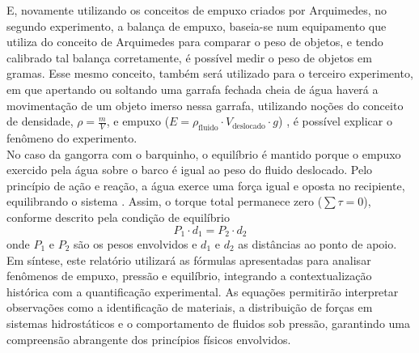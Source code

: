 E, novamente utilizando os conceitos de empuxo criados por Arquimedes, no segundo experimento, a balança de empuxo, baseia-se num equipamento que utiliza do conceito de Arquimedes para comparar o peso de objetos, e tendo calibrado tal balança corretamente, é possível medir o peso de objetos em gramas. Esse mesmo conceito, também será utilizado para o terceiro experimento, em que apertando ou soltando uma garrafa fechada cheia de água haverá a movimentação de um objeto imerso nessa garrafa, utilizando noções do conceito de densidade, $\rho = \frac{m}{V}$, e empuxo ($E = \rho_{\text{fluido}} \cdot V_{\text{deslocado}} \cdot g$) \cite{nussenzveig2014}, é possível explicar o fenômeno do experimento.\\

No caso da gangorra com o barquinho, o equilíbrio é mantido porque o empuxo exercido pela água sobre o barco é igual ao peso do fluido deslocado. Pelo princípio de ação e reação, a água exerce uma força igual e oposta no recipiente, equilibrando o sistema \cite{nussenzveig2014}. Assim, o torque total permanece zero ($\sum \tau = 0$), conforme descrito pela condição de equilíbrio
\begin{equation}
	P_1 \cdot d_1 = P_2 \cdot d_2 \label{eq:equilibrio}
\end{equation}
onde $P_1$ e $P_2$ são os pesos envolvidos e $d_1$ e $d_2$ as distâncias ao ponto de apoio.\\

Em síntese, este relatório utilizará as fórmulas apresentadas para analisar fenômenos de empuxo, pressão e equilíbrio, integrando a contextualização histórica com a quantificação experimental. As equações permitirão interpretar observações como a identificação de materiais, a distribuição de forças em sistemas hidrostáticos e o comportamento de fluidos sob pressão, garantindo uma compreensão abrangente dos princípios físicos envolvidos.\\


